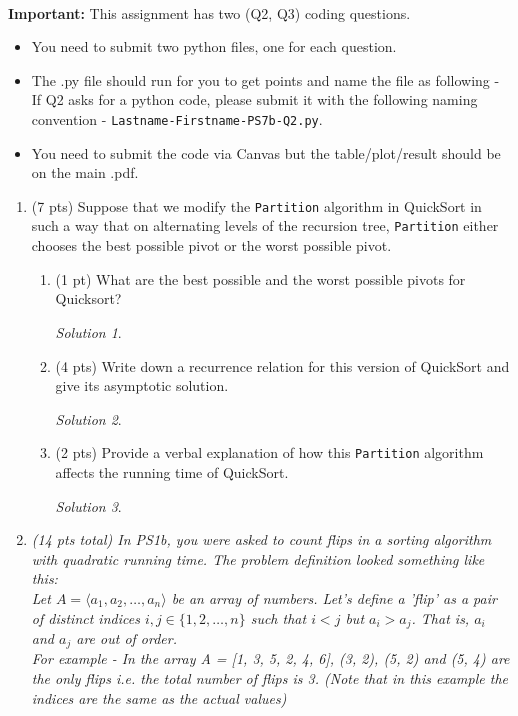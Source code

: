 \documentclass[12pt]{article}
\theoremstyle{remark}
\newtheorem*{solution}{Solution}
\begin{document}
\hrulefill
\pagebreak
\\
\textbf{Important:} This assignment has two (Q2, Q3) coding questions. 
\begin{itemize}
    \item You need to submit two python files, one for each question.
    \item The .py file should run for you to get points and name the file as following - \\
If Q2 asks for a python code, please submit it with the following naming convention - \texttt{Lastname-Firstname-PS7b-Q2.py}.
\item You need to submit the code via Canvas but the table/plot/result should be on the main .pdf.
\end{itemize}
\pagebreak

\begin{enumerate}
\item (7 pts) Suppose that we modify the {\tt Partition} algorithm in QuickSort in such a way that on alternating levels of the recursion tree, {\tt Partition} either chooses the best possible pivot or the worst possible pivot. 
\begin{enumerate}
    \item (1 pt) What are the best possible and the worst possible pivots for Quicksort?
\begin{solution}

\end{solution}

    \item (4 pts) Write down a recurrence relation for this version of QuickSort and give its asymptotic solution. 
\begin{solution}

\end{solution}
    \item (2 pts) Provide a verbal explanation of how this {\tt Partition} algorithm affects the running time of QuickSort.
\begin{solution}

\end{solution}

\end{enumerate}

\pagebreak

\item {\itshape (14 pts total)
In PS1b, you were asked to count flips in a sorting algorithm with quadratic running time. The problem definition looked something like this:\\
Let $A = \langle a_{1}, a_{2}, \ldots, a_{n} \rangle$ be an array of numbers. Let's define a \textit{'flip'} as a pair of distinct indices $i, j \in \{ 1, 2, \ldots, n\}$ such that $i < j$ but $a_{i} > a_{j}$. That is, $a_{i}$ and $a_{j}$ are out of order.\\ For example - In the array A = [1, 3, 5, 2, 4, 6], (3, 2), (5, 2) and (5, 4) are the only flips i.e. the total number of flips is 3. (Note that in this example the indices are the same as the actual values)}\\


\end{enumerate}
\end{document}

